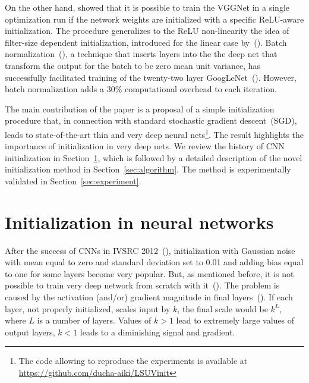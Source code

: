 \documentclass{article} \clearpage{}\usepackage{iclr2016_conference,times}
\begin{document}
On the other hand, \cite{MSRA2015} showed that it is possible to train the VGGNet in a single optimization run if the network weights are initialized with a specific ReLU-aware initialization. The \cite{MSRA2015} procedure 
generalizes to the ReLU non-linearity the idea of filter-size dependent initialization, introduced for the linear case by~(\cite{Xavier10}).
Batch normalization~(\cite{BatchNorm2015}), a technique that inserts layers into the the deep net that transform the output for the batch to be zero mean unit variance, has successfully facilitated training of the twenty-two layer GoogLeNet~(\cite{Googlenet2015}).
However, batch normalization adds a 30\% computational overhead to each iteration. 

The main contribution of the paper is a proposal of a simple initialization procedure that, in connection with standard stochastic gradient descent~(SGD), leads to state-of-the-art thin and very deep neural nets\footnote{The code allowing to reproduce the experiments is available at \\ \url{https://github.com/ducha-aiki/LSUVinit}}.
The result highlights the importance of initialization in very deep nets. We review the history of CNN initialization in Section~\ref{sec:initialization-review}, which is followed by a detailed description of the novel initialization method in Section~\ref{sec:algorithm}. The method is experimentally validated in Section~\ref{sec:experiment}.

\section {Initialization in neural networks}
\label{sec:initialization-review}

After the success of CNNs in IVSRC 2012~(\cite{AlexNet2012}), initialization with Gaussian noise with mean equal to zero and standard deviation set to 0.01 and adding bias equal to one for some layers become very popular. But, as mentioned before, it is not possible to train very deep network from scratch with it~(\cite{VGGNet2015}).
The problem is caused by the activation (and/or) gradient magnitude in final layers~(\cite{MSRA2015}). If each layer, not properly initialized, scales input by $k$, the final scale would be $k^{L}$, where $L$ is a number of layers. Values of $k>1$ lead to extremely large values of output layers,  $k<1$ leads to a diminishing signal and gradient.
\end{document}
